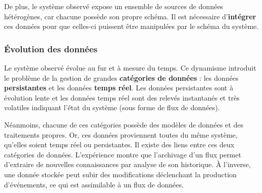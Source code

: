 De plus, le système observé expose un ensemble de sources de données hétérogènes, car chacune possède son propre schéma. Il est nécessaire d'\textbf{intégrer} ces données pour que celles-ci puissent être manipulées par le schéma du système.

\subsubsection{Évolution des données}
Le système observé évolue au fur et à mesure du temps. Ce dynamisme introduit le problème de la gestion de grandes \textbf{catégories de données} : les données \textbf{persistantes} et les données \textbf{temps réel}. Les données persistantes sont à évolution lente et les données temps réel sont des relevés instantanés et très volatiles indiquant l'état du système (sous forme de flux de données).

Néanmoins, chacune de ces catégories possède des modèles de données et des traitements propres. Or, ces données proviennent toutes du même système, qu'elles soient temps réel ou persistantes. Il existe des liens entre ces deux catégories de données. L'expérience montre que l'archivage d'un flux permet d'extraire de nouvelles connaissances par analyse de son historique. À l'inverse, une donnée stockée peut subir des modifications déclenchant la production d'événements, ce qui est assimilable à un flux de données.

